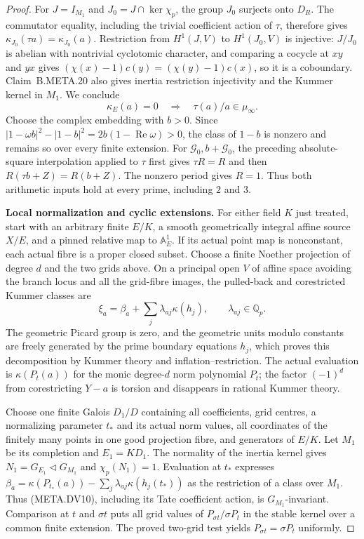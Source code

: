 \begin{proof}
For $J=I_{M_1}$ and $J_0=J\cap\ker\chi_p$,
the group $J_0$ surjects onto $D_R$.
The commutator equality, including the trivial
coefficient action of $\tau$, therefore gives
$\kappa_{J_0}(\tau a)=\kappa_{J_0}(a)$.
Restriction from $H^1(J,V)$ to $H^1(J_0,V)$ is
injective: $J/J_0$ is abelian with nontrivial
cyclotomic character, and comparing a cocycle
at $xy$ and $yx$ gives
$(\chi(x)-1)c(y)=(\chi(y)-1)c(x)$, so it is a
coboundary.
Claim~B.META.20 also gives inertia restriction
injectivity and the Kummer kernel in $M_1$.
We conclude
\[
             \kappa_E(a)=0\quad\Longrightarrow\quad
                                  \tau(a)/a\in\mu_\infty.      \tag{META.DV9}
\]
Choose the complex embedding with $b>0$.
Since
$|1-\omega b|^2-|1-b|^2=2b(1-\operatorname{Re}\omega)>0$,
the class of $1-b$ is nonzero and remains so over
every finite extension.
For $\mathcal G_0,b+\mathcal G_0$, the preceding
absolute-square interpolation applied to $\tau$
first gives $\tau R=R$ and then
$R(\tau b+Z)=R(b+Z)$.
The nonzero period gives $R=1$.
Thus both arithmetic inputs hold at every prime,
including $2$ and $3$.

\medskip\noindent\textbf{Local normalization and cyclic extensions.}
For either field $K$ just treated, start with an
arbitrary finite $E/K$, a smooth geometrically
integral affine source $X/E$, and a pinned relative
map to $\mathbb A^1_E$.
If its actual point map is nonconstant, each
actual fibre is a proper closed subset.
Choose a finite Noether projection of degree $d$
and the two grids above.
On a principal open $V$ of affine space avoiding
the branch locus and all the grid-fibre images,
the pulled-back and corestricted Kummer classes are
\[
          \xi_a=\beta_a+\sum_j\lambda_{aj}\kappa(h_j),
                      \qquad\lambda_{aj}\in\mathbb Q_p.        \tag{META.DV10}
\]
The geometric Picard group is zero, and the
geometric units modulo constants are freely
generated by the prime boundary equations $h_j$,
which proves this decomposition by Kummer theory
and inflation--restriction.
The actual evaluation is $\kappa(P_t(a))$ for
the monic degree-$d$ norm polynomial $P_t$;
the factor $(-1)^d$ from corestricting $Y-a$
is torsion and disappears in rational Kummer theory.

Choose one finite Galois $D_1/D$ containing
all coefficients, grid centres, a normalizing
parameter $t_*$ and its actual norm values,
all coordinates of the finitely many points in
one good projection fibre, and generators of $E/K$.
Let $M_1$ be its completion and $E_1=KD_1$.
The normality of the inertia kernel gives
$N_1=G_{E_1}\triangleleft G_{M_1}$ and
$\chi_p(N_1)=1$.
Evaluation at $t_*$ expresses
$\beta_a=\kappa(P_{t_*}(a))-\sum_j\lambda_{aj}
\kappa(h_j(t_*))$ as the restriction of a class
over $M_1$.
Thus (META.DV10), including its Tate coefficient
action, is $G_{M_1}$-invariant.
Comparison at $t$ and $\sigma t$ puts all grid
values of $P_{\sigma t}/\sigma P_t$ in the stable
kernel over a common finite extension.
The proved two-grid test yields
$P_{\sigma t}=\sigma P_t$ uniformly.


\end{proof}
